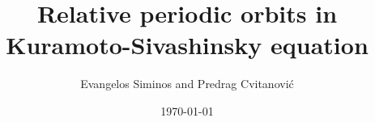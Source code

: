 \documentclass[pre,preprint]{revtex4}
\begin{document}
                \title{
Relative periodic orbits in Kuramoto-Sivashinsky equation
                 }
                  \author{
Evangelos Siminos
	and
Predrag Cvitanovi\'c
                          }
  
                  \date{\today} %
  
% 
                     \maketitle

% 





% 
        \begin{acknowledgments}

        \end{acknowledgments}

        \Preliminary{


            } %


\end{document}
